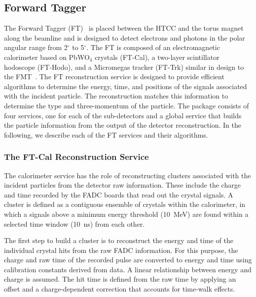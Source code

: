 \subsection{Forward Tagger}

The Forward Tagger (FT)~\cite{ft-nim} is placed between the HTCC and the torus magnet along the beamline
and is designed to detect electrons and photons in the polar angular range from 2$^\circ$ to 5$^\circ$. The
FT is composed of an electromagnetic calorimeter based on PbWO$_4$ crystals (FT-Cal), a two-layer scintillator
hodoscope (FT-Hodo), and a Micromegas tracker (FT-Trk) similar in design to the FMT~\cite{mm-nim}. The FT
reconstruction service is designed to provide efficient algorithms to determine the energy, time, and positions of
the signals associated with the incident particle. The reconstruction matches this information to determine the type
and three-momentum of the particle. The package consists of four services, one for each of the sub-detectors and a
global service that builds the particle information from the output of the detector reconstruction. In the following,
we describe each of the FT services and their algorithms.

\subsubsection{The FT-Cal Reconstruction Service}

The calorimeter service has the role of reconstructing clusters associated with the incident particles from the
detector raw information. These include the charge and time recorded by the FADC boards that read out the
crystal signals. A cluster is defined as a contiguous ensemble of crystals within the calorimeter, in which a signals
above a minimum energy threshold (10~MeV) are found within a selected time window (10~ns) from each other.

The first step to build a cluster is to reconstruct the energy and time of the individual crystal hits from the raw
FADC information. For this purpose, the charge and raw time of the recorded pulse are converted to energy and
time using calibration constants derived from data. A linear relationship between energy and charge is assumed.
The hit time is defined from the raw time by applying an offset and a charge-dependent correction that accounts
for time-walk effects.

